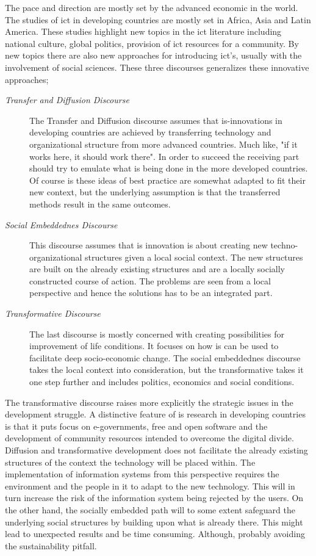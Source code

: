 The pace and direction are mostly set by the advanced economic in the world.
The studies of \gls{ict} in developing countries are mostly set in Africa, Asia and Latin America.
These studies highlight new topics in the \gls{ict} literature including national culture, global politics, provision of \gls{ict} resources for a community.
By new topics there are also new approaches for introducing \gls{ict}'s, usually with the involvement of social sciences.
These three discourses generalizes these innovative approaches;
\begin{description}
\item[\textit{Transfer and Diffusion Discourse}]
	The Transfer and Diffusion discourse assumes that \gls{is}-innovations in developing countries are achieved by transferring technology and organizational structure from more advanced countries. Much like, "if it works here, it should work there". In order to succeed the receiving part should try to emulate what is being done in the more developed countries. Of course \gls{is} these ideas of best practice are somewhat adapted to fit their new context, but the underlying assumption is that the transferred methods result in the same outcomes.
\item[\textit{Social Embeddednes Discourse}]
	This discourse assumes that \gls{is} innovation is about creating new techno-organizational structures given a local social context. The new structures are built on the already existing structures and are a locally socially constructed course of action. The problems are seen from a local perspective and hence the solutions has to be an integrated part.
\item[\textit{Transformative Discourse}]
	The last discourse is mostly concerned with creating possibilities for improvement of life conditions. It focuses on how \gls{is} can be used to facilitate deep socio-economic change.
	The social embeddednes discourse takes the local context into consideration, but the transformative takes it one step further and includes politics, economics and social conditions. 
\end{description}

The transformative discourse raises more explicitly the strategic issues in the development struggle.
A distinctive feature of \gls{is} research in developing countries is that it puts focus on e-governments, free and open software and the development of community resources intended to overcome the digital divide.
Diffusion and transformative development does not facilitate the already existing structures of the context the technology will be placed within.
The implementation of information systems from this perspective requires the environment and the people in it to adapt to the new technology.
This will in turn increase the risk of the information system being rejected by the users. On the other hand, the socially embedded path
will to some extent safeguard the underlying social structures by building upon what is already there. 
This might lead to unexpected results and be time consuming. Although, probably avoiding the sustainability pitfall.

